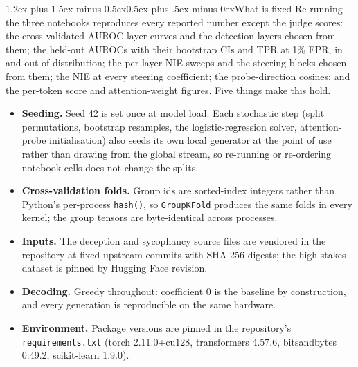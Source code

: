 \documentclass[conference]{IEEEtran}
\makeatletter
\renewcommand{\subsection}{\@startsection{subsection}{2}{\z@}%
  {1.2ex plus 1.5ex minus 0.5ex}{0.5ex plus .5ex minus 0ex}{\normalfont\normalsize\itshape}}
\makeatother
\begin{document}
\subsection{What is fixed}
Re-running the three notebooks reproduces every reported number except the judge scores: the
cross-validated AUROC layer curves and the detection layers chosen from them; the held-out AUROCs
with their bootstrap CIs and TPR at 1\% FPR, in and out of distribution; the per-layer NIE sweeps
and the steering blocks chosen from them; the NIE at every steering coefficient; the
probe-direction cosines; and the per-token score and attention-weight figures. Five things make
this hold.
\begin{itemize}
\item \textbf{Seeding.} Seed 42 is set once at model load. Each stochastic step (split
  permutations, bootstrap resamples, the logistic-regression solver, attention-probe
  initialisation) also seeds its own local generator at the point of use rather than drawing from
  the global stream, so re-running or re-ordering notebook cells does not change the splits.
\item \textbf{Cross-validation folds.} Group ids are sorted-index integers rather than Python's
  per-process \texttt{hash()}, so \texttt{GroupKFold} produces the same folds in every kernel; the
  group tensors are byte-identical across processes.
\item \textbf{Inputs.} The deception and sycophancy source files are vendored in the repository at
  fixed upstream commits with SHA-256 digests; the high-stakes dataset is pinned by Hugging Face
  revision.
\item \textbf{Decoding.} Greedy throughout: coefficient 0 is the baseline by construction, and
  every generation is reproducible on the same hardware.
\item \textbf{Environment.} Package versions are pinned in the repository's
  \texttt{requirements.txt} (torch 2.11.0+cu128, transformers 4.57.6, bitsandbytes 0.49.2,
  scikit-learn 1.9.0).
\end{itemize}
\end{document}
